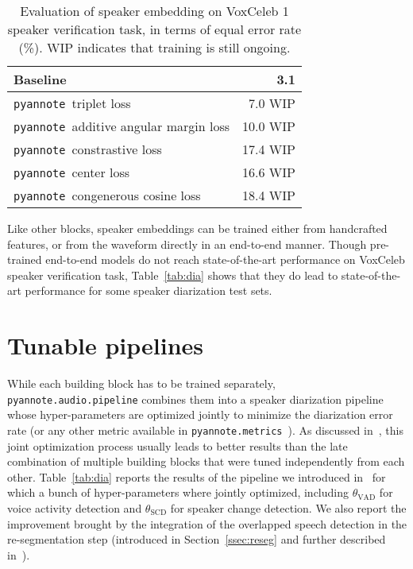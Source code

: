 \documentclass{article}
\def\pyannote{{\small\texttt{pyannote}}}
\begin{document}
\begin{table}[]
    \centering
    \begin{tabular}{|l|r|}
        \hline
        Baseline & 3.1 \cite{x-vector} \\
        \hline
        \pyannote~triplet loss & 7.0 {\scriptsize{WIP}} \\
        \pyannote~additive angular margin loss & 10.0 {\scriptsize{WIP}} \\
        \pyannote~constrastive loss & 17.4 {\scriptsize{WIP}} \\
        \pyannote~center loss & 16.6 {\scriptsize{WIP}} \\
        \pyannote~congenerous cosine loss& 18.4 {\scriptsize{WIP}} \\
        \hline
    \end{tabular}
    \caption{Evaluation of speaker embedding on VoxCeleb 1 speaker verification task, in terms of equal error rate (\%). {\scriptsize{WIP}} indicates that training is still ongoing.}
    \label{tab:emb}
\end{table}

Like other blocks, speaker embeddings can be trained either from handcrafted features, or from the waveform directly in an end-to-end manner. Though pre-trained end-to-end models do not reach state-of-the-art performance on VoxCeleb speaker verification task, Table~\ref{tab:dia} shows that they do lead to state-of-the-art performance for some speaker diarization test sets.

\vspace{-0.17cm}
\section{Tunable pipelines}
\label{sec:pipeline}

While each building block has to be trained separately, {\small \texttt{pyannote.audio.pipeline}} combines them into a speaker diarization pipeline whose hyper-parameters are optimized jointly to minimize the diarization error rate (or any other metric available in {\small \texttt{pyannote.metrics}}~\cite{pyannote.metrics}). As discussed in~\cite{Yin2018}, this joint optimization process usually leads to better results than the late combination of multiple building blocks that were tuned independently from each other. Table~\ref{tab:dia} reports the results of the pipeline we introduced in~\cite{Yin2018} for which a bunch of hyper-parameters where jointly optimized, including $\theta_\text{VAD}$ for voice activity detection and $\theta_\text{SCD}$ for speaker change detection. We also report the improvement brought by the integration of the overlapped speech detection in the re-segmentation step (introduced in Section~\ref{ssec:reseg} and further described in~\cite{Bullock2020}).
\end{document}
